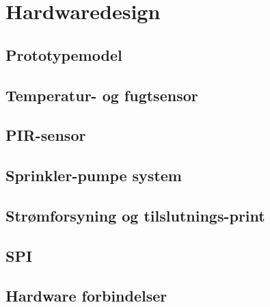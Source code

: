 \chapter{Hardwaredesign}

\section{Prototypemodel}


\section{Temperatur- og fugtsensor}


\section{PIR-sensor}


\section{Sprinkler-pumpe system}


\section{Strømforsyning og tilslutnings-print}


\section{SPI}



\section{Hardware forbindelser}
